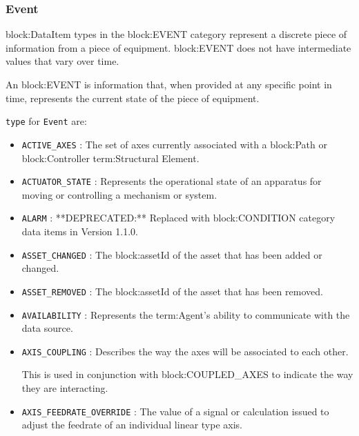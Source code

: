 \FloatBarrier

\subsubsection{Event}
  \label{sec:Event}


{block:DataItem} types in the {block:EVENT} category represent a discrete piece of information from a piece of equipment.  {block:EVENT} does not have intermediate values that vary over time.

An {block:EVENT} is information that, when provided at any specific point in time, represents the current state of the piece of equipment.


 \texttt{type} for \texttt{Event} are:
\begin{itemize}

\item \texttt{ACTIVE_AXES} : The set of axes currently associated with a {block:Path} or {block:Controller} {term:Structural Element}. 

\item \texttt{ACTUATOR_STATE} : Represents the operational state of an apparatus for moving or controlling a mechanism or system. 

\item \texttt{ALARM} : **DEPRECATED:** Replaced with {block:CONDITION} category data items in Version 1.1.0. 

\item \texttt{ASSET_CHANGED} : The {block:assetId} of the asset that has been added or changed. 

\item \texttt{ASSET_REMOVED} : The {block:assetId} of the asset that has been removed. 

\item \texttt{AVAILABILITY} : Represents the {term:Agent}'s ability to communicate with the data source. 

\item \texttt{AXIS_COUPLING} : Describes the way the axes will be associated to each other. 
  
This is used in conjunction with {block:COUPLED_AXES} to indicate the way they are interacting. 

\item \texttt{AXIS_FEEDRATE_OVERRIDE} : The value of a signal or calculation issued to adjust the feedrate of an individual linear type axis. 


\end{itemize}
